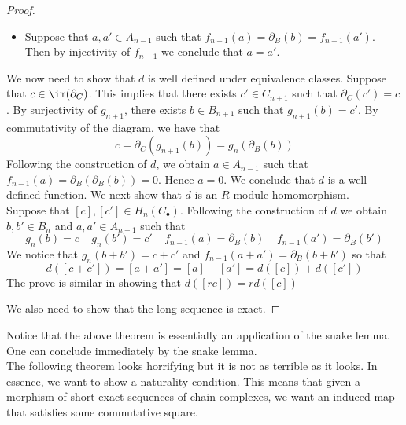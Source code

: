 \documentclass[a4paper]{article}
\begin{document}
\begin{thm}{}{}
\begin{proof}
\begin{itemize}
\item Suppose that $a,a'\in A_{n-1}$ such that $f_{n-1}(a)=\partial_B(b)=f_{n-1}(a')$. Then by injectivity of $f_{n-1}$ we conclude that $a=a'$. 
\end{itemize}
We now need to show that $d$ is well defined under equivalence classes. Suppose that $c\in\im(\partial_C)$. This implies that there exists $c'\in C_{n+1}$ such that $\partial_C(c')=c$. By surjectivity of $g_{n+1}$, there exists $b\in B_{n+1}$ such that $g_{n+1}(b)=c'$. By commutativity of the diagram, we have that $$c=\partial_C(g_{n+1}(b))=g_n(\partial_B(b))$$ Following the construction of $d$, we obtain $a\in A_{n-1}$ such that $f_{n-1}(a)=\partial_B(\partial_B(b))=0$. Hence $a=0$. We conclude that $d$ is a well defined function. We next show that $d$ is an $R$-module homomorphism. \\

Suppose that $[c],[c']\in H_n(C_\bullet)$. Following the construction of $d$ we obtain $b,b'\in B_n$ and $a,a'\in A_{n-1}$ such that $$g_n(b)=c\;\;\;\;g_n(b')=c'\;\;\;\;f_{n-1}(a)=\partial_B(b)\;\;\;\;f_{n-1}(a')=\partial_B(b')$$ We notice that $g_n(b+b')=c+c'$ and $f_{n-1}(a+a')=\partial_B(b+b')$ so that $$d([c+c'])=[a+a']=[a]+[a']=d([c])+d([c'])$$ The prove is similar in showing that $d([rc])=rd([c])$

We also need to show that the long sequence is exact. 
\end{proof}
\end{thm}

Notice that the above theorem is essentially an application of the snake lemma. One can conclude immediately by the snake lemma. \\

The following theorem looks horrifying but it is not as terrible as it looks. In essence, we want to show a naturality condition. This means that given a morphism of short exact sequences of chain complexes, we want an induced map that satisfies some commutative square. 
\end{document}
